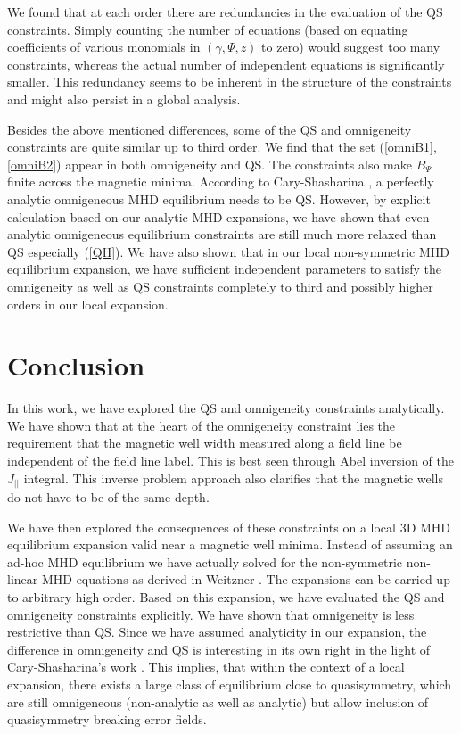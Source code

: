 \documentclass[aip,pop,reprint]{revtex4-1}
\newcommand*{\Jpl}{J_{||}}
\begin{document}
We found that at each order there are redundancies in the evaluation of the QS constraints. Simply counting the number of equations (based on equating coefficients of various monomials in $(\gamma,\Psi,z)$ to zero) would suggest too many constraints, whereas the actual number of independent equations is significantly smaller. This redundancy seems to be inherent in the structure of the constraints and might also persist in a global analysis.

Besides the above mentioned differences, some of the QS and omnigeneity constraints are quite similar up to third order. We find that the set (\ref{omniB1},\ref{omniB2}) appear in both omnigeneity and QS. The constraints also make $B_\Psi$ finite across the magnetic minima. According to Cary-Shasharina  \cite{caryshasharina1997omnigenity}, a perfectly analytic omnigeneous MHD equilibrium needs to be QS. However, by explicit calculation based on our analytic MHD expansions, we have shown that even analytic omnigeneous equilibrium constraints are still much more relaxed than QS especially (\ref{QH}). We have also shown that in our local non-symmetric MHD equilibrium expansion, we have sufficient independent parameters to satisfy the omnigeneity as well as QS constraints completely to third and possibly higher orders in our local expansion.



\section{Conclusion}
\label{sec:sum}
 In this work, we have explored the QS and omnigeneity constraints analytically. We have shown that at the heart of the omnigeneity constraint lies the requirement that the magnetic well width measured along a field line be independent of the field line label. This is best seen through Abel inversion of the $\Jpl$ integral. This inverse problem approach also clarifies that the magnetic wells do not have to be of the same depth. 
 
 We have then explored the consequences of these constraints on a local 3D MHD equilibrium expansion valid near a magnetic well minima. Instead of assuming an ad-hoc MHD equilibrium we have actually solved for the non-symmetric non-linear MHD equations as derived in Weitzner \cite{weitzner2016expansions}. The expansions can be carried up to arbitrary high order. Based on this expansion, we have evaluated the QS and omnigeneity constraints explicitly. We have shown that omnigeneity is less restrictive than QS. Since we have assumed analyticity in our expansion, the difference in omnigeneity and QS is interesting in its own right in the light of Cary-Shasharina's work \cite{caryshasharina1997omnigenity}. This implies, that within the context of a local expansion, there exists a large class of equilibrium  close to quasisymmetry, which are still omnigeneous (non-analytic as well as analytic) but allow inclusion of quasisymmetry breaking error fields.
  
\end{document}

